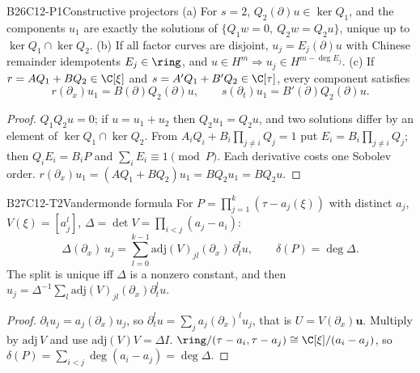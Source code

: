\begin{dimcard}{B26}{C12-P1}{Constructive projectors}{\proved}{}
(a) For $s=2$, $Q_2(\partial)u\in\ker Q_1$, and the components $u_1$ are exactly the solutions of $\{Q_1w=0,\ Q_2w=Q_2u\}$, unique up to $\ker Q_1\cap\ker Q_2$. (b) If all factor curves are disjoint, $u_j=E_j(\partial)u$ with Chinese remainder idempotents $E_j\in\ring$, and $u\in H^m\Rightarrow u_j\in H^{m-\deg E_j}$. (c) If $r=AQ_1+BQ_2\in\C[\xi]$ and $s=A'Q_1+B'Q_2\in\C[\tau]$, every component satisfies
\[
r(\partial_x)u_1=B(\partial)Q_2(\partial)u,\qquad s(\partial_t)u_1=B'(\partial)Q_2(\partial)u .
\]
\end{dimcard}
\begin{proof}
$Q_1Q_2u=0$; if $u=u_1+u_2$ then $Q_2u_1=Q_2u$, and two solutions differ by an element of $\ker Q_1\cap\ker Q_2$.
From $A_iQ_i+B_i\prod_{j\ne i}Q_j=1$ put $E_i=B_i\prod_{j\ne i}Q_j$; then $Q_iE_i=B_iP$ and $\sum_iE_i\equiv1\pmod P$. Each derivative costs one Sobolev order.
$r(\partial_x)u_1=(AQ_1+BQ_2)u_1=BQ_2u_1=BQ_2u$.
\end{proof}

\begin{dimcard}{B27}{C12-T2}{Vandermonde formula}{\proved}{}
For $P=\prod_{j=1}^k(\tau-a_j(\xi))$ with distinct $a_j$, $V(\xi)=[a_j^l]$, $\Delta=\det V=\prod_{i<j}(a_j-a_i)$:
\[
\Delta(\partial_x)\,u_j=\sum_{l=0}^{k-1}\mathrm{adj}(V)_{jl}(\partial_x)\,\partial_t^lu,\qquad \delta(P)=\deg\Delta .
\]
The split is unique iff $\Delta$ is a nonzero constant, and then $u_j=\Delta^{-1}\sum_l\mathrm{adj}(V)_{jl}(\partial_x)\partial_t^lu$.
\end{dimcard}
\begin{proof}
$\partial_tu_j=a_j(\partial_x)u_j$, so $\partial_t^lu=\sum_ja_j(\partial_x)^lu_j$, that is $U=V(\partial_x)\mathbf u$.
Multiply by $\mathrm{adj}\,V$ and use $\mathrm{adj}(V)V=\Delta I$.
$\ring/(\tau-a_i,\tau-a_j)\cong\C[\xi]/(a_i-a_j)$, so $\delta(P)=\sum_{i<j}\deg(a_i-a_j)=\deg\Delta$.
\end{proof}

